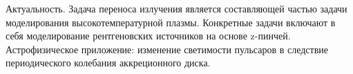 \intro
Актуальность. Задача переноса излучения является составляющей частью задачи моделирования высокотемпературной плазмы. Конкретные задачи включают в себя моделирование рентгеновских источников на
основе z-пинчей. Астрофизическое приложение: изменение
светимости пульсаров в следствие периодического
колебания аккреционного диска.